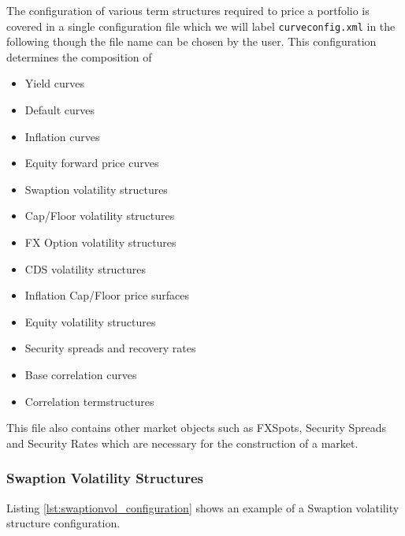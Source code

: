 \documentclass[12pt, a4paper]{article}
\begin{document}
{{The configuration of various term structures required to price a portfolio is covered in a single configuration file
which we will label {\tt curveconfig.xml} in the following though the file name can be chosen by the user. This
configuration determines the composition of 
\begin{itemize}
\item Yield curves %
\item Default curves %
\item Inflation curves %
\item Equity forward price curves %
\item Swaption volatility structures %
\item Cap/Floor volatility structures %
\item FX Option volatility structures %
\item CDS volatility structures %
\item Inflation Cap/Floor price surfaces %
\item Equity volatility structures %
\item Security spreads and recovery rates %
\item Base correlation curves %
\item Correlation termstructures %
\end{itemize}

This file also contains other market objects such as FXSpots, Security Spreads and Security Rates which are necessary
for the construction of a market.





\subsubsection{Swaption Volatility Structures}

Listing \ref{lst:swaptionvol_configuration} shows an example of a Swaption volatility structure configuration.

}}
\end{document}
